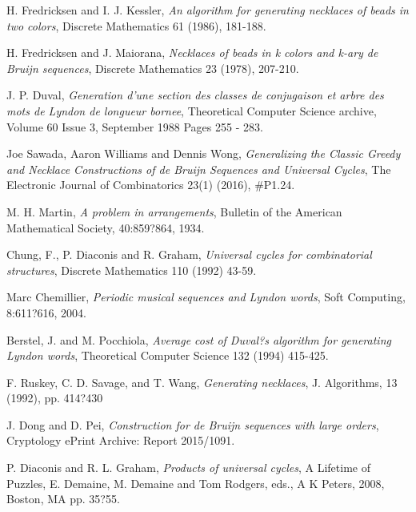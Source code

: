 \documentclass[12pt,twoside]{article}
\begin{document}
\begin{thebibliography}{9}
H. Fredricksen and I. J. Kessler,
\textit{An algorithm for generating necklaces of beads in two colors},
Discrete Mathematics 61 (1986), 181-188.

H. Fredricksen and J. Maiorana,
\textit{Necklaces of beads in k colors and k-ary de Bruijn sequences},
Discrete Mathematics 23 (1978), 207-210.

J. P. Duval,
\textit{Generation d'une section des classes de conjugaison et arbre des mots de Lyndon de longueur bornee},
Theoretical Computer Science archive, Volume 60 Issue 3, September 1988 Pages 255 - 283.

Joe Sawada, Aaron Williams and Dennis Wong,
\textit{Generalizing the Classic Greedy and Necklace Constructions of de Bruijn Sequences and Universal Cycles},
The Electronic Journal of Combinatorics 23(1) (2016), \#P1.24.


M. H. Martin,
\textit{A problem in arrangements},
Bulletin of the American Mathematical Society, 40:859?864, 1934.


Chung, F., P. Diaconis and R. Graham,
\textit{Universal cycles for combinatorial structures},
Discrete Mathematics 110 (1992) 43-59.


Marc Chemillier,
\textit{Periodic musical sequences and Lyndon words},
Soft Computing, 8:611?616, 2004.


Berstel, J. and M. Pocchiola,
\textit{Average cost of Duval?s algorithm for generating Lyndon words},
Theoretical Computer Science 132 (1994) 415-425. 


F. Ruskey, C. D. Savage, and T. Wang,
\textit{Generating necklaces},
J. Algorithms, 13 (1992), pp. 414?430


J. Dong and D. Pei,
\textit{Construction for de Bruijn sequences with large orders},
Cryptology ePrint Archive: Report 2015/1091.


P. Diaconis and R. L. Graham,
\textit{Products of universal cycles},
A Lifetime of Puzzles, E. Demaine, M. Demaine and Tom Rodgers, eds., A K Peters, 2008, Boston, MA pp. 35?55.


\end{thebibliography}
\end{document}

